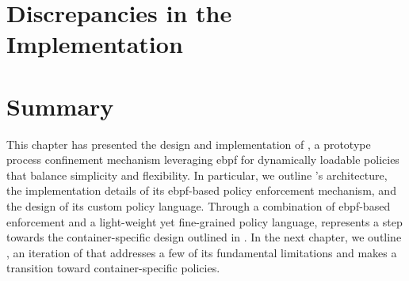 \section{Discrepancies in the \bpfbox{} Implementation}
\label{s:bpfbox-discrepancies}






\section{Summary}%
\label{s:bpfbox-summary}

This chapter has presented the design and implementation of \bpfbox{}, a prototype process
confinement mechanism leveraging \gls{ebpf} for dynamically loadable policies that balance
simplicity and flexibility. In particular, we outline \bpfbox{}'s architecture, the
implementation details of its \gls{ebpf}-based policy enforcement mechanism, and the
design of its custom policy language. Through a combination of \gls{ebpf}-based
enforcement and a light-weight yet fine-grained policy language, \bpfbox{} represents
a step towards the container-specific design outlined in .  In the next
chapter, we outline \bpfcontain{}, an iteration of \bpfbox{} that addresses a few of its
fundamental limitations and makes a transition toward container-specific policies.

